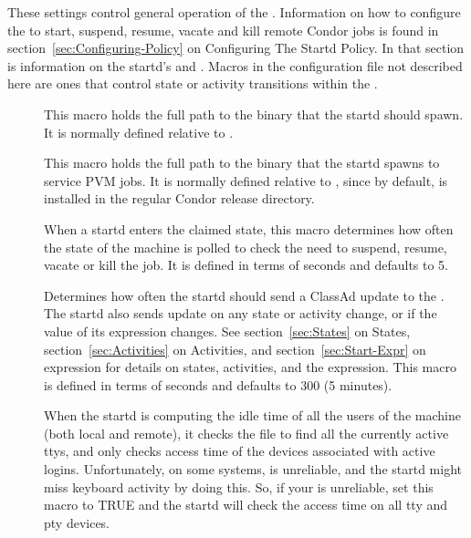 These settings control general operation of the .
Information on how to configure the  to start, suspend,
resume, vacate and kill remote Condor jobs is found in
section~\ref{sec:Configuring-Policy} on
Configuring The Startd Policy.  In that section is
information on the startd's  and .
Macros in the configuration file not described here are ones that
control state or activity transitions within the
.
\begin{description}

\item[] \label{param:Starter}  This macro holds the
  full path to the  binary that the startd should 
  spawn.
  It is normally defined relative to .
  
\item[] \label{param:AlternateStarter1}
  This macro holds the full path to the 
  binary that the startd spawns to service PVM jobs.  It is normally
  defined relative to , since by default,
   is installed in the regular Condor release
  directory. 
  
\item[] \label{param:PollingInterval} When a
  startd enters the claimed state, this macro determines how often
  the state of the machine is polled to check the need to suspend, resume,
  vacate or kill the job.  It is defined in terms of seconds and defaults to
  5.
  
\item[] \label{param:UpdateInterval}
  Determines how often the startd should send a ClassAd update
  to the .  The startd also sends update on any
  state or activity change, or if the value of its  expression
  changes.  See section~\ref{sec:States} on 
  States, section~\ref{sec:Activities} on 
  Activities, and section~\ref{sec:Start-Expr} on 
   expression for details on states, activities, and the
   expression.  This macro is defined in
  terms of seconds and defaults to 300 (5 minutes).
  
\item[] \label{param:StartdHasBadUtmp}
  When the startd is computing the idle time of all the
  users of the machine (both local and remote), it checks the
   file to find all the currently active ttys, and only
  checks access time of the devices associated with active logins.
  Unfortunately, on some systems,  is unreliable, and the
  startd might miss keyboard activity by doing this.  So, if your
   is unreliable, set this macro to TRUE and the
  startd will check the access time on all tty and pty devices.
  

\end{description}
